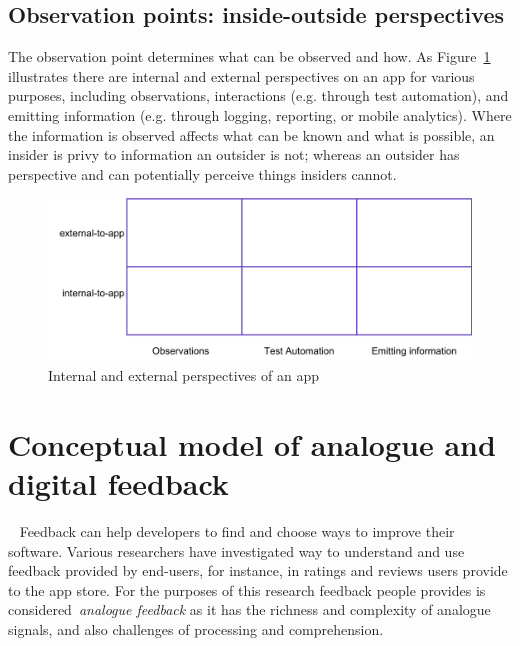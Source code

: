 \subsection{Observation points: inside-outside perspectives}
The observation point determines what can be observed and how. 
As Figure~\ref{fig:internal-external-table} illustrates there are internal and external perspectives on an app for various purposes, including observations, interactions (e.g. through test automation), and emitting information (e.g. through logging, reporting, or mobile analytics). Where the information is observed affects what can be known and what is possible, an insider is privy to information an outsider is not; whereas an outsider has perspective and can potentially perceive things insiders cannot.

\begin{figure}[htbp!]
    \centering
    \includegraphics[width=13cm]{images/internal-external-table.png}
    \caption{Internal and external perspectives of an app}
    \label{fig:internal-external-table}
\end{figure}


\section{Conceptual model of analogue and digital feedback}~\label{analogue-and-digital-feedback}
Feedback can help developers to find and choose ways to improve their software. Various researchers have investigated way to understand and use feedback provided by end-users, for instance, in ratings and reviews users provide to the app store. For the purposes of this research feedback people provides is considered~\emph{analogue feedback} as it has the richness and complexity of analogue signals, and also challenges of processing and comprehension.

